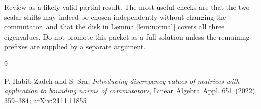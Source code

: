 \documentclass[11pt]{article}
\begin{document}
Review as a likely-valid partial result.  The most useful checks are that the
two scalar shifts may indeed be chosen independently without changing the
commutator, and that the disk in Lemma \ref{lem:normal} covers all three
eigenvalues.  Do not promote this packet as a full solution unless the
remaining prefixes are supplied by a separate argument.

\begin{thebibliography}{9}

P. Habib Zadeh and S. Sra,
\emph{Introducing discrepancy values of matrices with application to bounding
norms of commutators},
Linear Algebra Appl. 651 (2022), 359--384;
arXiv:2111.11855.

\end{thebibliography}
\end{document}
